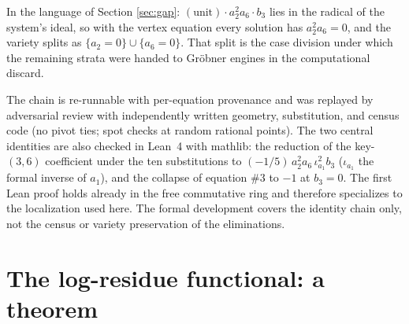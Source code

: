 \documentclass[11pt]{article}
\theoremstyle{definition}
\theoremstyle{remark}
\begin{document}
In the language of Section \ref{sec:gap}: $(\text{unit})\cdot a_2^2a_6\cdot b_3$ lies in the radical of the system's ideal, so with the vertex equation every solution has $a_2^2a_6=0$, and the variety splits as $\{a_2=0\}\cup\{a_6=0\}$. That split is the case division under which the remaining strata were handed to Gr\"obner engines in the computational discard.

The chain is re-runnable with per-equation provenance and was replayed by adversarial review with independently written geometry, substitution, and census code (no pivot ties; spot checks at random rational points). The two central identities are also checked in Lean~4 with mathlib: the reduction of the key-$(3,6)$ coefficient under the ten substitutions to $(-1/5)\,a_2^2a_6\,\iota_{a_1}^2 b_3$ ($\iota_{a_1}$ the formal inverse of $a_1$), and the collapse of equation $\#3$ to $-1$ at $b_3=0$. The first Lean proof holds already in the free commutative ring and therefore specializes to the localization used here. The formal development covers the identity chain only, not the census or variety preservation of the eliminations.

\section{The log-residue functional: a theorem}\label{sec:functional}
\end{document}
